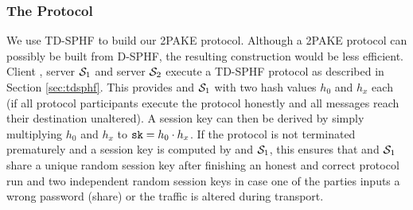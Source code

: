 \subsubsection{The Protocol}\label{sec:2pakeprotocol}
We use \ac{TD-SPHF} to build our \ac{2PAKE} protocol.
Although a \ac{2PAKE} protocol can possibly be built from \ac{D-SPHF}, the resulting construction would be less efficient.
Client \Client, server $\mathcal{S}_1$ and server $\mathcal{S}_2$ execute a \ac{TD-SPHF} protocol as described in Section \ref{sec:tdsphf}.
This provides \Client and $\mathcal{S}_1$ with two hash values $h_0$ and $h_x$ each (if all protocol participants execute the protocol honestly and all messages reach their destination unaltered).
A session key can then be derived by simply multiplying $h_0$ and $h_x$ to $\mathtt{sk}=h_0\cdot h_x$.
If the protocol is not terminated prematurely and a session key is computed by \Client and $\mathcal{S}_1$, this ensures that \Client and $\mathcal{S}_1$ share a unique random session key after finishing an honest and correct protocol run and two independent random session keys \sk in case one of the parties inputs a wrong password (share) or the traffic is altered during transport.


